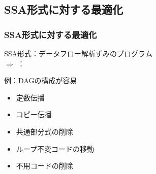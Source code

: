 \documentclass[dvipdfmx]{beamer}
\begin{document}
\subsection{SSA形式に対する最適化}

\begin{frame}
  \frametitle{SSA形式に対する最適化}
  SSA形式：データフロー解析ずみのプログラム\\[2zw]

  $\Rightarrow$
  ：

  例：DAGの構成が容易

  \vspace*{1zw}

  \begin{itemize}
    \item 定数伝播
    \item コピー伝播
    \item 共通部分式の削除
    \item ループ不変コードの移動
    \item 不用コードの削除
  \end{itemize}
\end{frame}
\end{document}
